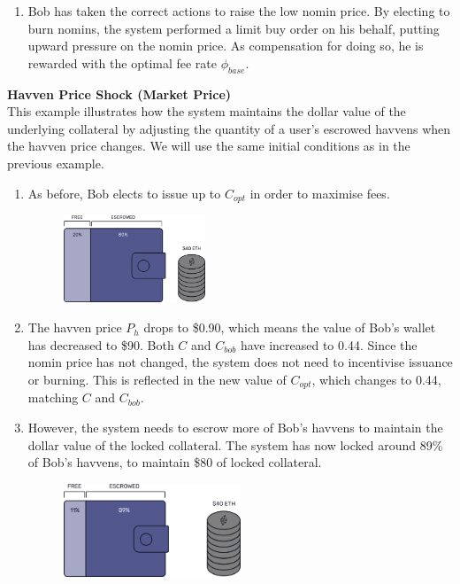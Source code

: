 \begin{enumerate}
    \item{Bob has taken the correct actions to raise the low nomin price. By
          electing to burn nomins, the system performed a limit buy order on his
          behalf, putting upward pressure on the nomin price. As compensation for doing
          so, he is rewarded with the optimal fee rate $\phi_{base}$.
    }
\end{enumerate}


\newpage
\noindent \textbf{Havven Price Shock (Market Price)} \\

\noindent This example illustrates how the system maintains the dollar value of the underlying
collateral by adjusting the quantity of a user's escrowed havvens when the
havven price changes. We will use the same initial conditions as in the previous example.

\begin{enumerate}
\item{As before, Bob elects to issue up to $C_{opt}$ in order to maximise fees.}
\begin{figure}[h!]
    \centering
    \includegraphics[width=0.4\textwidth]{img/escrowed}
\end{figure}
\item{The havven price $P_h$ drops to \$0.90, which means the value of Bob's wallet has decreased to \$90. Both $C$ and $C_{bob}$ have increased to 0.44. Since the nomin price has not changed, the system does not need to incentivise issuance or burning. This is reflected in the new value of $C_{opt}$, which changes to 0.44, matching $C$ and $C_{bob}$. }
\item{However, the system needs to escrow more of Bob's havvens to maintain the dollar value of the locked collateral. The system has now locked around 89\% of Bob's havvens, to maintain \$80 of locked collateral.}
\begin{figure}[h!]
    \centering
    \includegraphics[width=0.5\textwidth]{img/ph_drop}
\end{figure}
\end{enumerate} 


